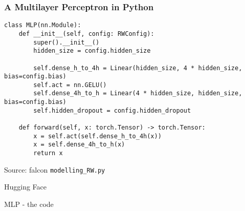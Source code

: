 \documentclass{beamer}
\begin{document}
\begin{frame}[fragile]
\frametitle{A Multilayer Perceptron in Python}
{\tiny\begin{verbatim}
class MLP(nn.Module):
    def __init__(self, config: RWConfig):
        super().__init__()
        hidden_size = config.hidden_size

        self.dense_h_to_4h = Linear(hidden_size, 4 * hidden_size, bias=config.bias)
        self.act = nn.GELU()
        self.dense_4h_to_h = Linear(4 * hidden_size, hidden_size, bias=config.bias)
        self.hidden_dropout = config.hidden_dropout

    def forward(self, x: torch.Tensor) -> torch.Tensor:
        x = self.act(self.dense_h_to_4h(x))
        x = self.dense_4h_to_h(x)
        return x
\end{verbatim}}
Source: falcon {\tt modelling_RW.py}
\end{frame}

\begin{frame}
Hugging Face

MLP - the code
\end{frame}
\end{document}
